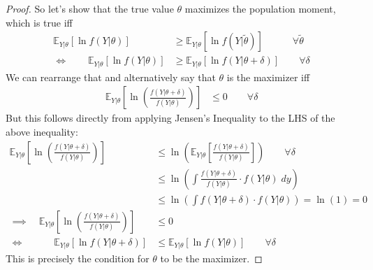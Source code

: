 \documentclass[12pt]{article}
\theoremstyle{plain}
\theoremstyle{definition}
\theoremstyle{remark}
\newcommand{\E}{\mathbb{E}}
\begin{document}
\begin{proof}
So let's show that the true value $\theta$ maximizes the population
moment, which is true iff
\begin{align*}
  \E_{Y|\theta}[\ln f(Y|\theta)]
  &\geq
  \E_{Y|\theta}[\ln f(Y|\tilde{\theta})]
  \quad\qquad\forall \tilde{\theta} \\
  \Leftrightarrow\qquad
  \E_{Y|\theta}[\ln f(Y|\theta)]
  &\geq
  \E_{Y|\theta}[\ln f(Y|\theta + \delta)]
  \qquad\forall \delta
\end{align*}
We can rearrange that and alternatively say that $\theta$ is the
maximizer iff
\begin{align*}
  \E_{Y|\theta}\left[
    \ln\left(\frac{f(Y|\theta + \delta)}{f(Y|\theta)}\right)
  \right]
  &\leq 0
  \qquad\forall \delta
\end{align*}
But this follows directly from applying Jensen's Inequality to the LHS
of the above inequality:
\begin{align*}
  \E_{Y|\theta}\left[
    \ln \left(\frac{f(Y|\theta + \delta)}{f(Y|\theta)}\right)
  \right]
  &\leq
  \ln \left(
  \E_{Y|\theta}\left[
   \frac{f(Y|\theta + \delta)}{f(Y|\theta)}
  \right]
  \right) \qquad \forall\delta\\
  &\leq
  \ln \left(
  \int
   \frac{f(Y|\theta + \delta)}{f(Y|\theta)}
   \cdot f(Y|\theta)
   \; dy
  \right) \\
  &\leq
  \ln \left(
  \int
   f(Y|\theta + \delta)
   \cdot f(Y|\theta)
  \right)
  = \ln(1) = 0\\
  \implies\quad
  \E_{Y|\theta}\left[
    \ln \left(\frac{f(Y|\theta + \delta)}{f(Y|\theta)}\right)
  \right]
  &\leq
  0 \\
  \iff\quad\qquad
  \E_{Y|\theta}\left[
    \ln f(Y|\theta + \delta)
  \right]
  &\leq
  \E_{Y|\theta}\left[
    \ln f(Y|\theta)
  \right]
  \qquad \forall\delta
\end{align*}
This is precisely the condition for $\theta$ to be the maximizer.
\end{proof}
\end{document}
